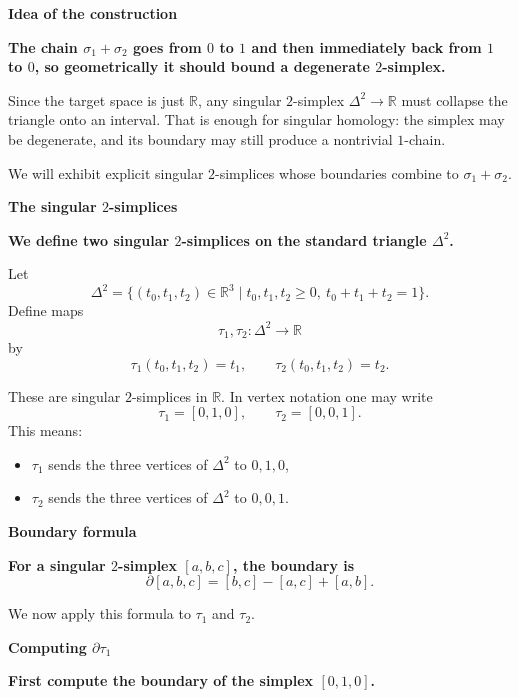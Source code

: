 \begin{solution}

\medskip
\noindent\textbf{Idea of the construction}\par
\smallskip


\textbf{The chain \(\sigma_1+\sigma_2\) goes from \(0\) to \(1\) and then immediately back from \(1\) to \(0\), so geometrically it should bound a degenerate \(2\)-simplex.}

Since the target space is just \(\mathbb{R}\), any singular \(2\)-simplex \(\Delta^2\to \mathbb{R}\) must collapse the triangle onto an interval. That is enough for singular homology: the simplex may be degenerate, and its boundary may still produce a nontrivial \(1\)-chain.

We will exhibit explicit singular \(2\)-simplices whose boundaries combine to \(\sigma_1+\sigma_2\).


\medskip
\noindent\textbf{The singular \(2\)-simplices}\par
\smallskip


\textbf{We define two singular \(2\)-simplices on the standard triangle \(\Delta^2\).}

Let
\[
\Delta^2=\{(t_0,t_1,t_2)\in \mathbb{R}^3 \mid t_0,t_1,t_2\ge 0,\ t_0+t_1+t_2=1\}.
\]
Define maps
\[
\tau_1,\tau_2:\Delta^2\to \mathbb{R}
\]
by
\[
\tau_1(t_0,t_1,t_2)=t_1,
\qquad
\tau_2(t_0,t_1,t_2)=t_2.
\]

These are singular \(2\)-simplices in \(\mathbb{R}\). In vertex notation one may write
\[
\tau_1=[0,1,0],
\qquad
\tau_2=[0,0,1].
\]
This means:

\begin{itemize}
	\item \(\tau_1\) sends the three vertices of \(\Delta^2\) to \(0,1,0\),
	\item \(\tau_2\) sends the three vertices of \(\Delta^2\) to \(0,0,1\).
\end{itemize}


\medskip
\noindent\textbf{Boundary formula}\par
\smallskip


\textbf{For a singular \(2\)-simplex \([a,b,c]\), the boundary is}
\[
\partial[a,b,c]=[b,c]-[a,c]+[a,b].
\]

We now apply this formula to \(\tau_1\) and \(\tau_2\).


\medskip
\noindent\textbf{Computing \(\partial \tau_1\)}\par
\smallskip


\textbf{First compute the boundary of the simplex \([0,1,0]\).}


\end{solution}

